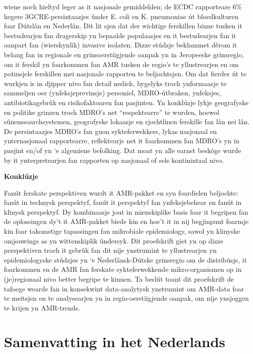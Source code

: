 \documentclass[
]{book}
\begin{document}
wiene noch hieltyd leger as it nasjonale gemiddelden; de ECDC rapporteare 6\% hegere 3GCRE-persintaazjes ûnder E. coli en K. pneumoniae út bloedkulturen foar Dútslân en Nederlân. Dit lit sjen dat der wichtige ferskillen binne tusken it bestudearjen fan dragerskip yn bepaalde populaasjes en it bestudearjen fan it oanpart fan (wierskynlik) invasive isolaten. Dizze stúdzje beklammet dêrom it belang fan in regionale en grinsoerstiigjende oanpak yn in Jeropeeske grinsregio, om it ferskil yn foarkommen fan AMR tusken de regio's te yllustrearjen en om potinsjele ferskillen mei nasjonale rapporten te beljochtsjen. Om dat fierder út te wurkjen is in djipper nivo fan detail nedich, bygelyks troch ynformaasje te sammeljen oer (ynfeksjeprevinsje) personiel, MDRO-útbraken, ynfeksjes, antibiotikagebrûk en risikofaktoaren fan pasjinten. Yn konklúzje lykje geografyske en politike grinzen troch MDRO's net ``respektearre'' te wurden, hoewol sûnenssoarchsystemen, geografyske lokaasje en rjochtlinen ferskille fan lân nei lân. De persintaazjes MDRO's fan guon sykteferwekkers, lykas nasjonaal en ynternasjonaal rapportearre, reflektearje net it foarkommen fan MDRO's yn in pasjint en/of yn `e algemiene befolking. Dat moat yn alle earnst beskôge wurde by it ynterpretearjen fan rapporten op nasjonaal of sels kontinintaal nivo.

\textbf{Konklúzje}

Fanút ferskate perspektiven wurdt it AMR-pakket en syn foardielen beljochte: fanút in technysk perspektyf, fanút it perspektyf fan ynfeksjebehear en fanút in klinysk perspektyf. Dy kombinaasje jout in mienskiplike basis foar it begripen fan de oplossingen dy't it AMR-pakket biede kin en hoe't it in nij begjinpunt foarmje kin foar takomstige tapassingen fan mikrobiale epidemiology, sawol yn klinyske omjouwings as yn wittenskiplik ûndersyk. Dit proefskrift giet yn op dizze perspektiven troch it gebrûk fan dit nije ynstrumint te yllustrearjen yn epidemiologyske stúdzjes yn `e Nederlânsk-Dútske grinsregio om de distribúsje, it foarkommen en de AMR fan ferskate sykteferwekkende mikro-organismen op in (je)regionaal nivo better begripe te kinnen. Ta beslút toant dit proefskrift de tafoege wearde fan in konsekwint data-analytysk ynstrumint om AMR-data foar te meitsjen en te analysearjen yn in regio-oerstiigjende oanpak, om nije ynsjoggen te krijen yn AMR-trends.

\hypertarget{samenvatting-in-het-nederlands}{%
\chapter*{Samenvatting in het Nederlands}\label{samenvatting-in-het-nederlands}}
\end{document}
